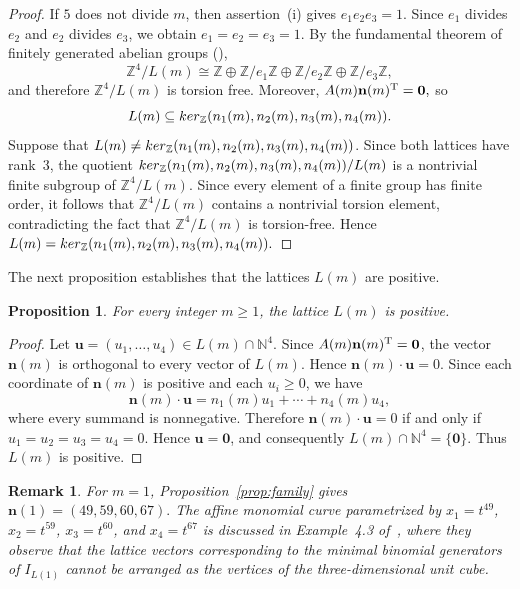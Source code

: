 \documentclass[10pt,a4paper]{amsart}
\newtheorem{proposition}[theorem]{Proposition}
\newtheorem{remark}[theorem]{Remark}
\begin{document}
\begin{proof}
If $5$ does not divide $m$, then assertion~\textup{(i)} gives
$e_1e_2e_3=1$.
Since $e_1$ divides $e_2$ and $e_2$ divides $e_3$, we obtain
$e_1=e_2=e_3=1$.
By the fundamental theorem of finitely generated abelian groups
(\cite[Section~12.1]{DF}),
\[
\mathbb Z^4/L(m)
\cong
\mathbb Z
\oplus
\mathbb Z/e_1\mathbb Z
\oplus
\mathbb Z/e_2\mathbb Z
\oplus
\mathbb Z/e_3\mathbb Z,
\]
and therefore $\mathbb Z^4/L(m)$ is torsion free.
Moreover,
$
A(m)\mathbf n(m)^{\mathrm T}={\bf 0},$
so
$$
L(m) \subseteq {\rm ker}_{\mathbb Z}(n_{1}(m),n_{2}(m),n_{3}(m),n_{4}(m)).$$
Suppose that $L(m) \neq {\rm ker}_{\mathbb Z}(n_{1}(m),n_{2}(m),n_{3}(m),n_{4}(m))$. Since both lattices have
rank~$3$, the quotient
${\rm ker}_{\mathbb Z}(n_{1}(m),n_{2}(m),n_{3}(m),n_{4}(m))/L(m)$
is a nontrivial finite subgroup of $\mathbb Z^4/L(m)$. Since every element of a finite group has finite order, it follows that $\mathbb Z^4/L(m)$ contains a nontrivial torsion element, contradicting the fact that
$\mathbb Z^4/L(m)$ is torsion-free. Hence
$
L(m)={\rm ker}_{\mathbb Z}(n_{1}(m),n_{2}(m),n_{3}(m),n_{4}(m)).$
\end{proof}

The next proposition establishes that the lattices $L(m)$ are
positive.

\begin{proposition}
\label{prop:positive}
For every integer $m\ge1$, the lattice $L(m)$ is positive.
\end{proposition}

\begin{proof}
Let $\mathbf u=(u_1,\ldots,u_4)\in L(m)\cap\mathbb N^4$. Since
$A(m)\mathbf n(m)^{\mathrm T}={\bf 0}$, the vector $\mathbf n(m)$ is
orthogonal to every vector of $L(m)$. Hence
$
\mathbf n(m)\cdot\mathbf u=0.$
Since each coordinate of $\mathbf n(m)$ is positive and each
$u_i\ge0$, we have
\[
\mathbf n(m)\cdot\mathbf u
=
n_1(m)u_1+\cdots+n_4(m)u_4,
\]
where every summand is nonnegative. Therefore
$\mathbf n(m)\cdot\mathbf u=0$ if and only if
$u_1=u_2=u_3=u_4=0$. Hence
$\mathbf u=\mathbf0$, and consequently
$
L(m)\cap\mathbb N^4=\{\mathbf0\}.$
Thus $L(m)$ is positive.
\end{proof}

\begin{remark}
For $m=1$, Proposition~\ref{prop:family} gives
$\mathbf n(1)=(49,59,60,67).$ The affine monomial curve parametrized by
$x_1=t^{49}$, $x_2=t^{59}$, $x_3=t^{60}$, and $x_4=t^{67}$
is discussed in Example~4.3 of~\cite{OP},
where they observe that the lattice vectors
corresponding to the minimal binomial generators of $I_{L(1)}$
cannot be arranged as the vertices of the three-dimensional unit cube.
\end{remark}
\end{document}
